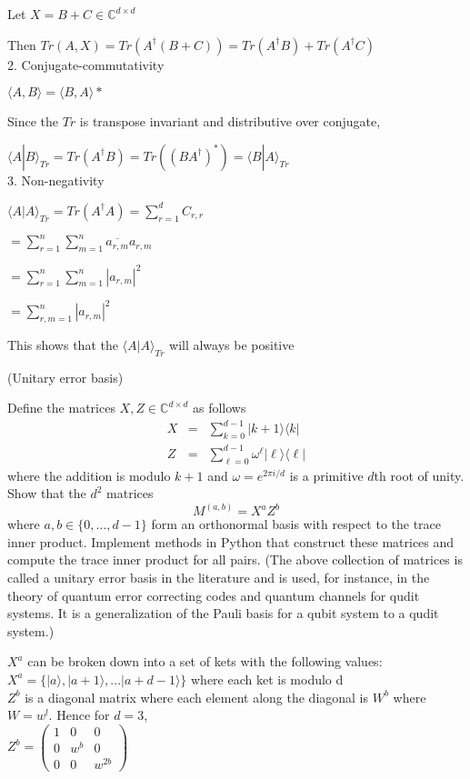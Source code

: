 \documentclass[12pt]{article}
\renewcommand{\>}{\rangle}
\newcommand{\<}{\langle}
\newcommand{\C}{\mathbb{C}}
\begin{document}
	\quad Let $X = B + C \in\C^{d\times d}$
	
	\quad Then $Tr(A,X) = Tr(A^\dagger (B+C)) = Tr(A^\dagger B) + Tr(A^\dagger C)$ \\

2. Conjugate-commutativity

	\quad $\<A,B\> = \<B,A\>*$

	\quad Since the $Tr$ is transpose invariant and distributive over conjugate,
	
	\quad $\<A|B\>_{Tr} = Tr(A^\dagger B) = Tr((BA^\dagger)^*) = \<B|A\>_{Tr} $ \\ 
	
3. Non-negativity
	
	\quad $ \<A|A\>_{Tr} = Tr(A^\dagger A) = \sum_{r=1}^d C_{r,r} $ 

	\quad $ = \sum_{r=1}^n \sum_{m=1}^n \overline{a_{r,m}} a_{r,m} $
	
	\quad $ = \sum_{r=1}^n \sum_{m=1}^n |a_{r,m}|^2$
	
	\quad $ = \sum_{r,m=1}^n |a_{r,m}|^2$

	\quad This shows that the $\<A|A\>_{Tr} $ will always be positive
\newpage


 (Unitary error basis)

\noindent
Define the matrices $X,Z\in\C^{d\times d}$ as follows
\begin{eqnarray}
X & = & \sum_{k=0}^{d-1} |k+1\>\<k| \\
Z & = & \sum_{\ell=0}^{d-1} \omega^\ell |\ell\>\<\ell|
\end{eqnarray}
where the addition is modulo $k+1$ and $\omega=e^{2\pi i/d}$ is a primitive $d$th root of unity. Show that the $d^2$ matrices
\[
M^{(a,b)} = X^a Z^b
\]
where $a,b\in\{0,\ldots, d-1\}$ form an orthonormal basis with respect to the trace inner product. Implement methods in Python that construct these matrices and compute the trace inner product for all pairs. (The above collection of matrices is called a unitary error basis in the literature and is used, for instance, in the theory of quantum error correcting codes and quantum channels for qudit systems. It is a generalization of the Pauli basis for a qubit system to a qudit system.)


$X^a$ can be broken down into a set of kets with the following values: \\

	\quad $ X^a = \{ |a\>, |a+1\>, ... |a+d-1\> \} $ where each ket is modulo d \\
	
$Z^b$ is a diagonal matrix where each element along the diagonal is $W^b$ where $W = w^l$. Hence for $d=3$, \\

	\quad $Z^b = \left(\begin{array}{ccc} 1 & 0 & 0 \\ 0 & w^b & 0 \\ 0 & 0 & w^{2b} \end{array}\right)	$
\end{document}
